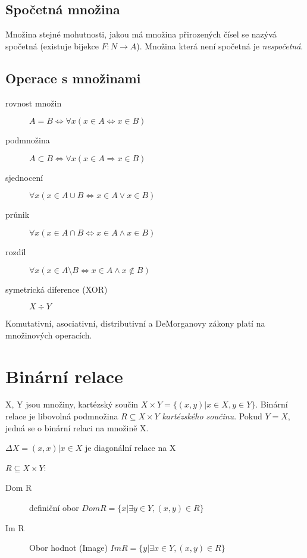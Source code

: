 \documentclass[a4wide]{report}
\begin{document}
\subsection{Spočetná množina}
Množina stejné mohutnosti, jakou má množina přirozených čísel se nazývá spočetná (existuje bijekce $F: N \to A$). Množina která není spočetná je \emph{nespočetná}.

\subsection{Operace s množinami}

\begin{description}
	\item[rovnost množin] $A = B \iff \forall x (x \in A \iff x \in B)$
	\item[podmnožina] $ A \subset B \iff \forall x (x \in A \Rightarrow x \in B)$
	\item[sjednocení] $ \forall x (x \in A \cup B \iff x \in A \lor x \in B)$
	\item[průnik] $ \forall x ( x \in A \cap B \iff x \in A \land x \in B)$
	\item[rozdíl] $ \forall x ( x \in A \setminus B \iff x \in A \land x \notin B)$
	\item[symetrická diference (XOR)] $X \div Y$ 
\end{description}

Komutativní, asociativní, distributivní a DeMorganovy zákony platí na množinových operacích.

\section{Binární relace}

X, Y jsou množiny, kartézský součin $X \times Y = \{(x,y) | x \in X, y \in Y\}$. Binární relace je libovolná podmnožina $R \subseteq X \times Y$ \emph{kartézského součinu}. Pokud $Y = X$, jedná se o binární relaci na množině X.

$\Delta{}X = {(x,x) | x \in X}$ je diagonální relace na X

$R \subseteq X \times Y$:
\begin{description}
	\item[Dom R] definiční obor $Dom R = \{x | \exists y  \in Y, (x,y) \in R\}$
	\item[Im R] Obor hodnot (Image) $Im R = \{y | \exists x  \in Y, (x,y) \in R\}$
\end{description}
\end{document}
